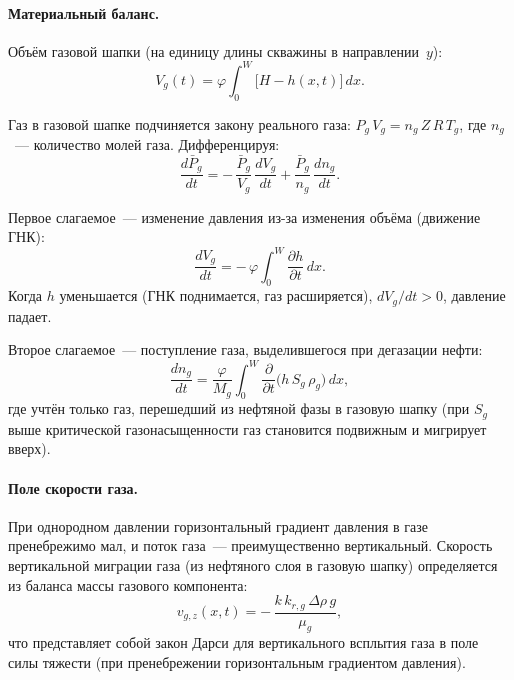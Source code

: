\documentclass[12pt,a4paper]{article}
\begin{document}
\paragraph{Материальный баланс.}
Объём газовой шапки (на единицу длины скважины в направлении~$y$):
\begin{equation}\label{eq:Vg}
  V_g(t) = \varphi \int_0^{W} \bigl[H - h(x,t)\bigr]\,dx.
\end{equation}

Газ в газовой шапке подчиняется закону реального газа:
$P_g\,V_g = n_g\,Z\,R\,T_g$, где $n_g$~--- количество молей газа.
Дифференцируя:
\begin{equation}\label{eq:gas_cap_balance}
  \boxed{\;
    \frac{d\bar{P}_g}{dt}
    = -\,\frac{\bar{P}_g}{V_g}\,\frac{dV_g}{dt}
    + \frac{\bar{P}_g}{n_g}\,\frac{dn_g}{dt}.
  \;}
\end{equation}

Первое слагаемое~--- изменение давления из-за изменения объёма
(движение ГНК):
\begin{equation}\label{eq:dVg_dt}
  \frac{dV_g}{dt}
    = -\,\varphi \int_0^{W} \frac{\partial h}{\partial t}\,dx.
\end{equation}
Когда $h$ уменьшается (ГНК поднимается, газ расширяется),
$dV_g/dt > 0$, давление падает.

Второе слагаемое~--- поступление газа, выделившегося при дегазации
нефти:
\begin{equation}\label{eq:dng_dt}
  \frac{dn_g}{dt}
    = \frac{\varphi}{M_g} \int_0^{W}
      \frac{\partial}{\partial t}
      \bigl(h\,S_g\,\rho_g\bigr)\,dx,
\end{equation}
где учтён только газ, перешедший из нефтяной фазы в газовую шапку
(при $S_g$ выше критической газонасыщенности газ становится подвижным
и мигрирует вверх).

\paragraph{Поле скорости газа.}
При однородном давлении горизонтальный градиент давления в газе
пренебрежимо мал, и поток газа~--- преимущественно вертикальный.
Скорость вертикальной миграции газа (из нефтяного слоя в газовую шапку)
определяется из баланса массы газового компонента:
\begin{equation}\label{eq:vg_vertical}
  v_{g,z}(x,t) = -\,\frac{k\,k_{r,g}\,\Delta\rho\,g}{\mu_g},
\end{equation}
что представляет собой закон Дарси для вертикального всплытия газа
в поле силы тяжести (при пренебрежении горизонтальным градиентом
давления).
\end{document}

